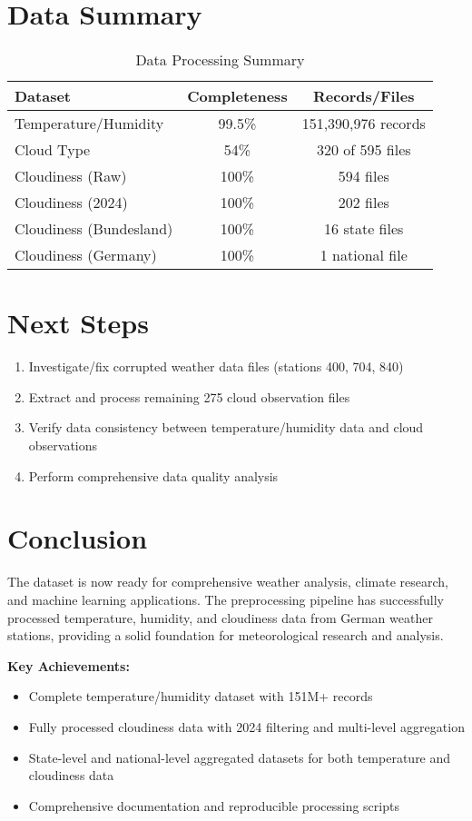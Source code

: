 \documentclass[11pt,a4paper]{article}
\begin{document}
\section{Data Summary}
\begin{table}[h]
\centering
\begin{tabular}{@{}lcc@{}}
\toprule
\textbf{Dataset} & \textbf{Completeness} & \textbf{Records/Files} \\
\midrule
Temperature/Humidity & 99.5\% & 151,390,976 records \\
Cloud Type & 54\% & 320 of 595 files \\
Cloudiness (Raw) & 100\% & 594 files \\
Cloudiness (2024) & 100\% & 202 files \\
Cloudiness (Bundesland) & 100\% & 16 state files \\
Cloudiness (Germany) & 100\% & 1 national file \\
\bottomrule
\end{tabular}
\caption{Data Processing Summary}
\end{table}

\section{Next Steps}
\begin{enumerate}
    \item Investigate/fix corrupted weather data files (stations 400, 704, 840)
    \item Extract and process remaining 275 cloud observation files
    \item Verify data consistency between temperature/humidity data and cloud observations
    \item Perform comprehensive data quality analysis
\end{enumerate}

\section{Conclusion}
The dataset is now ready for comprehensive weather analysis, climate research, and machine learning applications. The preprocessing pipeline has successfully processed temperature, humidity, and cloudiness data from German weather stations, providing a solid foundation for meteorological research and analysis.

\textbf{Key Achievements:}
\begin{itemize}
    \item Complete temperature/humidity dataset with 151M+ records
    \item Fully processed cloudiness data with 2024 filtering and multi-level aggregation
    \item State-level and national-level aggregated datasets for both temperature and cloudiness data
    \item Comprehensive documentation and reproducible processing scripts
\end{itemize}
\end{document}
